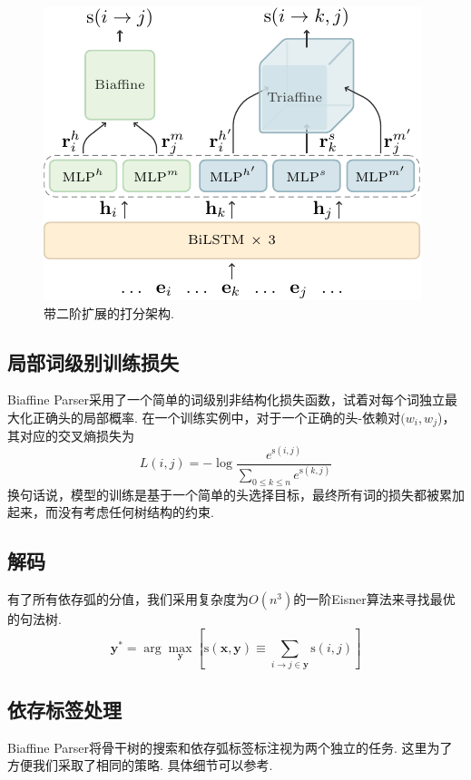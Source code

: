 \begin{figure}[tb]
    \centering
    \includegraphics[scale=1.5]{figures/dep-framework.pdf}
    \caption{带二阶扩展的打分架构.}
    \label{fig:dep-framework}
\end{figure}

\subsection{局部词级别训练损失}
Biaffine Parser采用了一个简单的词级别非结构化损失函数，试着对每个词独立最大化正确头的局部概率.
在一个训练实例中，对于一个正确的头-依赖对$(w_i, w_j$)，其对应的交叉熵损失为
\begin{equation} \label{eq:biaffine-loss}
    \mathit{L}(i,j) = -\log{\frac{e^{\mathrm{s}(i,j)}}{\sum_{0 \le k \le n} e^{\mathrm{s}(k,j)}}}
\end{equation}
换句话说，模型的训练是基于一个简单的头选择目标，最终所有词的损失都被累加起来，而没有考虑任何树结构的约束.

\subsection{解码}
有了所有依存弧的分值，我们采用复杂度为$O(n^3)$的一阶Eisner算法来寻找最优的句法树.
\begin{equation}
    \label{eq:map-decoding}
    {\boldsymbol{y}}^* = \arg\max_{\boldsymbol{y}} \left[ \mathrm{s}(\boldsymbol{x},\boldsymbol{y}) \equiv
        \sum_{i \rightarrow j \in \boldsymbol{y}}{\mathrm{s}(i,j)} \right]
\end{equation}

\subsection{依存标签处理}
Biaffine Parser将骨干树的搜索和依存弧标签标注视为两个独立的任务.
这里为了方便我们采取了相同的策略. 具体细节可以参考\cite{Timothy-d17-biaffine}.

